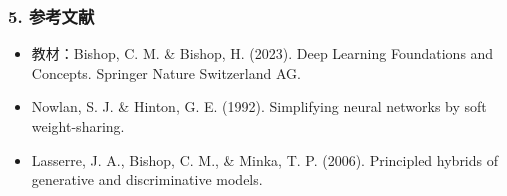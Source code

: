 \documentclass[t,aspectratio=169]{beamer} %
\begin{document}
\begin{frame}
    \frametitle{5. 参考文献}
    \begin{itemize}
        \item 教材：Bishop, C. M. \& Bishop, H. (2023). Deep Learning Foundations and Concepts. Springer Nature Switzerland AG.
        \item Nowlan, S. J. \& Hinton, G. E. (1992). Simplifying neural networks by soft weight-sharing.
        \item Lasserre, J. A., Bishop, C. M., \& Minka, T. P. (2006). Principled hybrids of generative and discriminative models.
    \end{itemize}
\end{frame}
\end{document}
